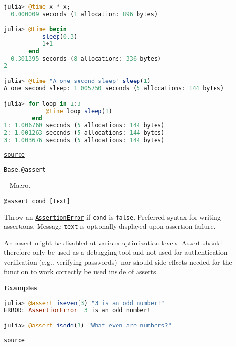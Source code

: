 \begin{adjustwidth}{2em}{0pt}
\begin{lstlisting}[language=julia, style=jlcodestyle]
julia> @time x * x;
  0.000009 seconds (1 allocation: 896 bytes)

julia> @time begin
           sleep(0.3)
           1+1
       end
  0.301395 seconds (8 allocations: 336 bytes)
2

julia> @time "A one second sleep" sleep(1)
A one second sleep: 1.005750 seconds (5 allocations: 144 bytes)

julia> for loop in 1:3
            @time loop sleep(1)
        end
1: 1.006760 seconds (5 allocations: 144 bytes)
2: 1.001263 seconds (5 allocations: 144 bytes)
3: 1.003676 seconds (5 allocations: 144 bytes)
\end{lstlisting}



\href{https://github.com/JuliaLang/julia/blob/8e630552924eac54c809aa7bc30871c7df1582d3/base/timing.jl#L206-L260}{\texttt{source}}


\end{adjustwidth}
\hypertarget{1046448939276307341}{\texttt{Base.@assert}}  -- {Macro.}

\begin{adjustwidth}{2em}{0pt}


\begin{lstlisting}[]
@assert cond [text]
\end{lstlisting}

Throw an \href{@ref}{\texttt{AssertionError}} if \texttt{cond} is \texttt{false}. Preferred syntax for writing assertions. Message \texttt{text} is optionally displayed upon assertion failure.

\begin{tcolorbox}[toptitle=-1mm,bottomtitle=1mm,colback=admonition-warning!50!white,colframe=admonition-warning,title=\textbf{Warning}]
An assert might be disabled at various optimization levels. Assert should therefore only be used as a debugging tool and not used for authentication verification (e.g., verifying passwords), nor should side effects needed for the function to work correctly be used inside of asserts.

\end{tcolorbox}
\textbf{Examples}


\begin{lstlisting}[language=julia, style=jlcodestyle]
julia> @assert iseven(3) "3 is an odd number!"
ERROR: AssertionError: 3 is an odd number!

julia> @assert isodd(3) "What even are numbers?"
\end{lstlisting}



\href{https://github.com/JuliaLang/julia/blob/8e630552924eac54c809aa7bc30871c7df1582d3/base/error.jl#L197-L217}{\texttt{source}}


\end{adjustwidth}

